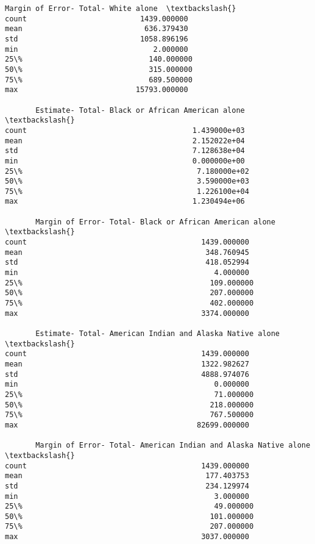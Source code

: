 \documentclass[11pt]{article}
\begin{document}
\begin{tcolorbox}[breakable, size=fbox, boxrule=.5pt, pad at break*=1mm, opacityfill=0]
\begin{Verbatim}[commandchars=\\\{\}]
       Margin of Error- Total- White alone  \textbackslash{}
count                          1439.000000
mean                            636.379430
std                            1058.896196
min                               2.000000
25\%                             140.000000
50\%                             315.000000
75\%                             689.500000
max                           15793.000000

       Estimate- Total- Black or African American alone  \textbackslash{}
count                                      1.439000e+03
mean                                       2.152022e+04
std                                        7.128638e+04
min                                        0.000000e+00
25\%                                        7.180000e+02
50\%                                        3.590000e+03
75\%                                        1.226100e+04
max                                        1.230494e+06

       Margin of Error- Total- Black or African American alone  \textbackslash{}
count                                        1439.000000
mean                                          348.760945
std                                           418.052994
min                                             4.000000
25\%                                           109.000000
50\%                                           207.000000
75\%                                           402.000000
max                                          3374.000000

       Estimate- Total- American Indian and Alaska Native alone  \textbackslash{}
count                                        1439.000000
mean                                         1322.982627
std                                          4888.974076
min                                             0.000000
25\%                                            71.000000
50\%                                           218.000000
75\%                                           767.500000
max                                         82699.000000

       Margin of Error- Total- American Indian and Alaska Native alone  \textbackslash{}
count                                        1439.000000
mean                                          177.403753
std                                           234.129974
min                                             3.000000
25\%                                            49.000000
50\%                                           101.000000
75\%                                           207.000000
max                                          3037.000000


\end{Verbatim}
\end{tcolorbox}
\end{document}
